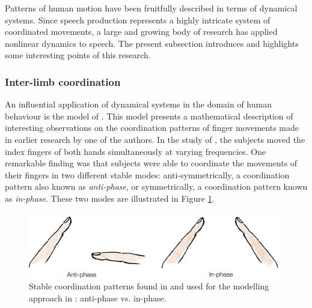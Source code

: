 Patterns of human motion have been fruitfully described in terms of dynamical systems. Since speech production represents a highly intricate system of coordinated movements, a large and growing body of research has applied nonlinear dynamics to speech. The present subsection introduces and highlights some interesting points of this research.

\subsubsection{Inter-limb coordination}

An influential application of dynamical systems in the domain of human behaviour is the model of \citet{HakenKelsoBunz1985}. This model presents a mathematical description of interesting observations on the coordination patterns of finger movements made in earlier research by one of the authors. In the study of \citet{Kelso1981}, the subjects moved the index fingers of both hands simultaneously at varying frequencies. One remarkable finding was that subjects were able to coordinate the movements of their fingers in two different stable modes: anti-symmetrically, a coordination pattern also known as \emph{anti-phase}, or symmetrically, a coordination pattern known as \emph{in-phase}. These two modes are illustrated in Figure \ref{fig:hkb_fingers}.

\begin{figure}[!htbp]
\begin{center}
\includegraphics[width=11cm]{figures/ch3/hkb_fingers.png}
\caption[Stable coordination patterns found in \citet{Kelso1981}.]{Stable coordination patterns found in \citet{Kelso1981} and used for the modelling approach in \citet{HakenKelsoBunz1985}: anti-phase vs. in-phase.}
\label{fig:hkb_fingers}
\end{center}
\end{figure}


